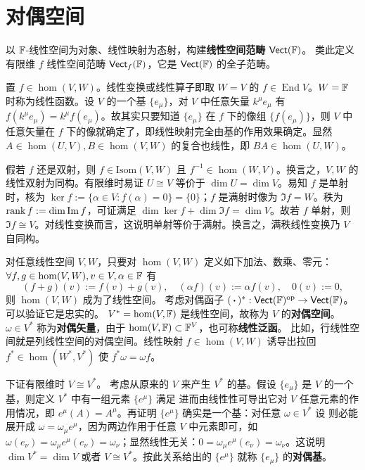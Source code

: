 \section{对偶空间}\label{sec:dual-space}

以 $\mathbb{F}$-线性空间为对象、线性映射为态射，构建\textbf{线性空间范畴} $\mathsf{Vect}(\mathbb{F})$。
类此定义有限维 $f$ 线性空间范畴 $\mathsf{Vect}_f(\mathbb{F})$，它是 $\mathsf{Vect}(\mathbb{F})$ 的全子范畴。

置 $f\in\hom(V,W)$。线性变换或线性算子即取 $W=V$ 的 $f\in\operatorname{End} V$。$W=\mathbb{F}$ 时称为线性函数。设 $V$ 的一个基 $\{e_\mu\}$，对 $V$ 中任意矢量 $k^\mu e_\mu$ 有 $f(k^\mu e_\mu)=k^\mu f(e_\mu)$。故其实只要知道 $\{e_\mu\}$ 在 $f$ 下的像组 $\{f(e_\mu)\}$，则 $V$ 中任意矢量在 $f$ 下的像就确定了，即线性映射完全由基的作用效果确定。显然 $A\in\hom(U,V),B\in\hom(V,W)$ 的复合也线性，即 $BA\in\hom(U,W)$。

假若 $f$ 还是双射，则 $f\in\mathrm{Isom}(V, W)$ 且 $f^{-1}\in\hom(W,V)$。换言之，$V,W$ 的线性双射为同构。有限维时易证 $U\cong V$ 等价于 $\dim U=\dim V$。易知 $f$ 是单射时，核为 $\ker f:=\{\alpha\in V:f(\alpha)=0\}=\{0\}$；$f$ 是满射时像为 $\Im f=W$。秩为 $\rank f:=\dim \Im f$，可证满足 $\dim \ker f + \dim \Im f = \dim V$。故若 $f$ 单射，则 $\Im f\cong V$。对线性变换而言，这说明单射等价于满射。换言之，满秩线性变换乃 $V$ 自同构。

对任意线性空间 $V,W$，只要对 $\hom(V,W)$ 定义如下加法、数乘、零元：$\forall f,g\in \hom(V,W),v\in V,\alpha\in\mathbb{F}$ 有
\[(f+g)(v):=f(v)+g(v),\quad (\alpha f)(v):=\alpha f(v),\quad 0(v):=0,\]
则 $\hom(V,W)$ 成为了线性空间。
考虑对偶函子 $(\oo)^*:\cate{Vect}(\F)^\mathrm{op}\to \cate{Vect}(\F)$。
可以验证它是忠实的。
$V^*=\hom(V,\mathbb{F})$ 是线性空间，故称为 $V$ 的\textbf{对偶空间}。$\omega\in V^*$ 称为\textbf{对偶矢量}，由于 $\hom(V,\mathbb{F})\subset\mathbb{F}^V$，也可称\textbf{线性泛函}。
比如，行线性空间就是列线性空间的对偶空间。线性映射 $f\in\hom(V,W)$ 诱导出拉回 $f^*\in\hom(W^*, V^*)$ 使 $f^*\omega=\omega f$。

下证有限维时 $V\cong V^*$。
考虑从原来的 $V$ 来产生 $V^*$ 的基。假设 $\{e_\mu\}$ 是 $V$ 的一个基，则定义 $V^*$ 中有一组元素 $\{e^\mu\}$ 满足
进而由线性性可导出它对 $V$ 任意元素的作用情况，即 $e^\mu(A)=A^\mu$。再证明 $\{e^\mu\}$ 确实是一个基：对任意 $\omega\in V^*$ 设
则必能展开成 $\omega=\omega_\mu e^\mu$，因为两边作用于任意 $V$ 中元素即可，如 $\omega(e_\nu)=\omega_\mu e^\mu(e_\nu)=\omega_\nu$；显然线性无关：$0=\omega_\mu e^\mu(e_\nu)=\omega_\nu$。这说明 $\dim V^*=\dim V$ 或者 $V\cong V^*$。按此关系给出的 $\{e^\mu\}$ 就称 $\{e_\mu\}$ 的\textbf{对偶基}。

